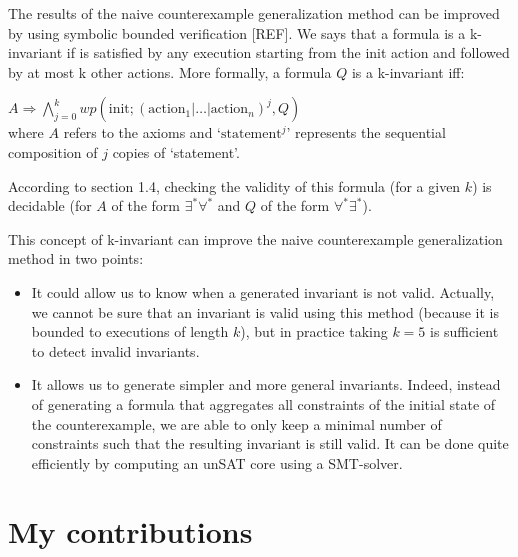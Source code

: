 \documentclass[11pt,a4paper,oldfontcommands]{memoir}
\begin{document}
    The results of the naive counterexample generalization method can be improved by using symbolic bounded verification [REF].
    We says that a formula is a k-invariant if is satisfied by any execution starting from the init action and followed by at most k
    other actions. More formally, a formula \(Q\) is a k-invariant iff:

    \( A \Rightarrow \bigwedge\limits_{j=0}^k wp(\text{init}; (\text{action}_1|\ldots|\text{action}_n)^j, Q) \)\\
    where \(A\) refers to the axioms and `\(\text{statement}^j\)' represents the sequential composition of \(j\) copies of `statement'.

    According to section 1.4, checking the validity of this formula (for a given \(k\)) is decidable (for \(A\) of the form \(\exists^*\forall^*\) and \(Q\) of the form \(\forall^*\exists^*\)).

    This concept of k-invariant can improve the naive counterexample generalization method in two points:
    \begin{itemize}
        \item It could allow us to know when a generated invariant is not valid.
        Actually, we cannot be sure that an invariant is valid using this method (because it is bounded to executions of length \(k\)),
        but in practice taking \(k=5\) is sufficient to detect invalid invariants.
        \item It allows us to generate simpler and more general invariants. Indeed, instead of generating a formula that
        aggregates all constraints of the initial state of the counterexample, we are able to only keep a minimal number of constraints
        such that the resulting invariant is still valid. It can be done quite efficiently by computing an unSAT core using a SMT-solver.
    \end{itemize}



\chapter{My contributions}

\end{document}
